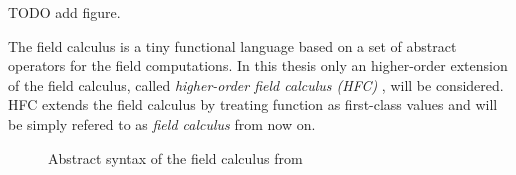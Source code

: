 TODO add figure.

The field calculus is a tiny functional language based on a set of abstract operators for the field computations. In this thesis only an higher-order extension of the field calculus, called \textit{higher-order field calculus (HFC)} \cite{FieldCalculus}, will be considered. HFC extends the field calculus by treating function as first-class values and will be simply refered to as \textit{field calculus} from now on.

\begin{figure}[t]
\centering
\centerline{
}
\caption{Abstract syntax of the field calculus from \cite{FieldCalculus}} \label{fig:fcsyntax}
\end{figure}

